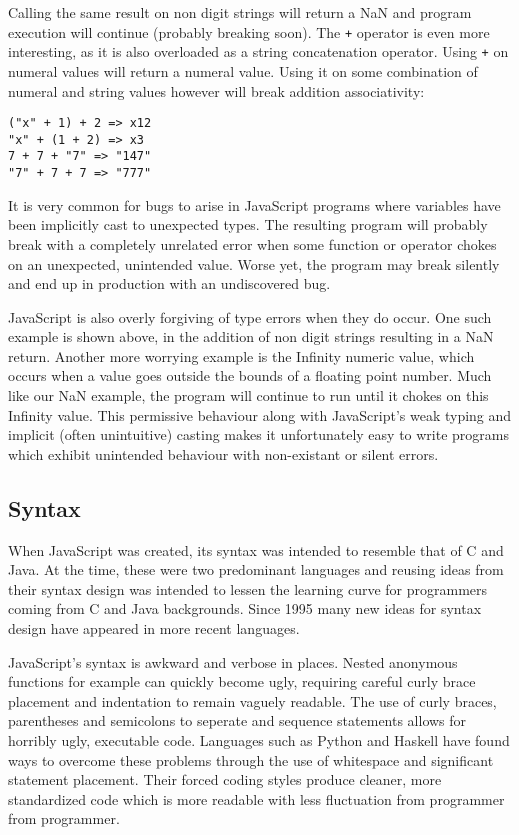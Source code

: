 \noindent Calling the same result on non digit strings will return a NaN and
program execution will continue (probably breaking soon). The \verb!+! operator
is even more interesting, as it is also overloaded as a string concatenation
operator. Using \verb!+! on numeral values will return a numeral value. 
Using it on some combination of numeral and string values however will break
addition associativity:

\begin{center}
	\verb!("x" + 1) + 2 => x12! \\
	\verb!"x" + (1 + 2) => x3! \\
	\verb!7 + 7 + "7" => "147"! \\
	\verb!"7" + 7 + 7 => "777"!
\end{center}

\noindent It is very common for bugs to arise in JavaScript programs where
variables have been implicitly cast to unexpected types. The
resulting program will probably break with a completely unrelated error
when some function or operator chokes on an unexpected, unintended value.
Worse yet, the program may break silently and end up in production with 
an undiscovered bug.

JavaScript is also overly forgiving of type errors when they do occur.
One such example is shown above, in the addition of non digit strings
resulting in a NaN return. Another more worrying example is the Infinity
numeric value, which occurs when a value goes outside the bounds of
a floating point number. Much like our NaN example, the program will
continue to run until it chokes on this Infinity value. This permissive
behaviour along with JavaScript's weak typing and implicit (often unintuitive)
casting makes it unfortunately easy to write programs which exhibit
unintended behaviour with non-existant or silent errors.
 


\subsection{Syntax}
When JavaScript was created, its syntax was intended to resemble that 
of C and Java. At the time, these were two predominant languages and
reusing ideas from their syntax design was intended to lessen the 
learning curve for programmers coming from C and Java backgrounds.
Since 1995 many new ideas for syntax design have appeared in more
recent languages. 

JavaScript's syntax is awkward and verbose in places. Nested 
anonymous functions for example can quickly become ugly, requiring
careful curly brace placement and indentation to remain vaguely
readable. The use of curly braces, parentheses and semicolons to
seperate and sequence statements allows for horribly ugly, executable
code. Languages such as Python and Haskell have found ways
to overcome these problems through the use of whitespace and significant
statement placement. Their forced coding styles produce cleaner, more
standardized code which is more readable with less fluctuation from
programmer from programmer. 

